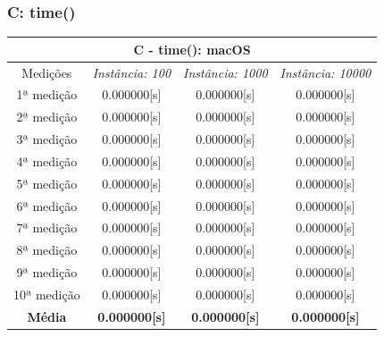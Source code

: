 \documentclass[12pt,a4paper,titlepage]{article}
\begin{document}
\subsubsection{C: time()}
\begin{center}
    \begin{tabular}{||c|c|c|c||}
        \hline
        \multicolumn{4}{||c||}{\textbf{C - time(): macOS}}\\
        \hline \hline
        Medições & \textit{Instância: 100} & \textit{Instância: 1000} & \textit{Instância: 10000}\\
        \hline
        1ª medição & 0.000000[s] & 0.000000[s] & 0.000000[s]\\
        \hline
        2ª medição & 0.000000[s] & 0.000000[s] & 0.000000[s]\\
        \hline
        3ª medição & 0.000000[s] & 0.000000[s] & 0.000000[s]\\
        \hline
        4ª medição & 0.000000[s] & 0.000000[s] & 0.000000[s]\\
        \hline
        5ª medição & 0.000000[s] & 0.000000[s] & 0.000000[s]\\
        \hline
        6ª medição & 0.000000[s] & 0.000000[s] & 0.000000[s]\\
        \hline
        7ª medição & 0.000000[s] & 0.000000[s] & 0.000000[s]\\
        \hline
        8ª medição & 0.000000[s] & 0.000000[s] & 0.000000[s]\\
        \hline
        9ª medição & 0.000000[s] & 0.000000[s] & 0.000000[s]\\
        \hline
        10ª medição & 0.000000[s] & 0.000000[s] & 0.000000[s]\\
        \hline
        \textbf{Média} & \textbf{0.000000[s]} & \textbf{0.000000[s]} & \textbf{0.000000[s]}\\
        \hline
    \end{tabular}
\end{center}
\end{document}
